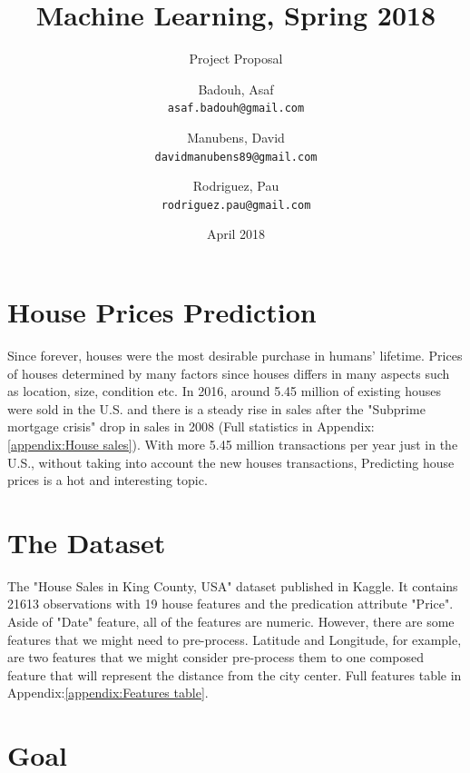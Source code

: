\documentclass{scrartcl}
\title{Machine Learning, Spring 2018}
\subtitle{Project Proposal}
\author{
  Badouh, Asaf\\
  \texttt{asaf.badouh@gmail.com}
  \and
  Manubens, David\\
  \texttt{davidmanubens89@gmail.com}
  \and
  Rodriguez, Pau\\
  \texttt{rodriguez.pau@gmail.com}
}
\date{April 2018}
\begin{document}
\maketitle
\newpage

\section{House Prices Prediction}
Since forever, houses were the most desirable purchase in humans' lifetime. Prices of houses determined by many factors since houses differs in many aspects such as location, size, condition etc. In 2016, around 5.45 million of existing houses were sold in the U.S.\cite{statista} and there is a steady rise in sales after the "Subprime mortgage crisis" drop in sales in 2008 (Full statistics in Appendix:\ref{appendix:House sales}). With more 5.45 million transactions per year just in the U.S., without taking into account the new houses transactions, Predicting house prices is a hot and interesting topic.

\section{The Dataset}
The "House Sales in King County, USA" dataset published in Kaggle\cite{DB}. It contains 21613 observations with 19 house features and the predication attribute "Price".
Aside of "Date" feature, all of the features are numeric. However, there are some features that we might need to pre-process. Latitude and Longitude, for example, are two features that we might consider pre-process them to one composed feature that will represent the distance from the city center.
Full features table in Appendix:\ref{appendix:Features table}.

\section{Goal}
\end{document}
